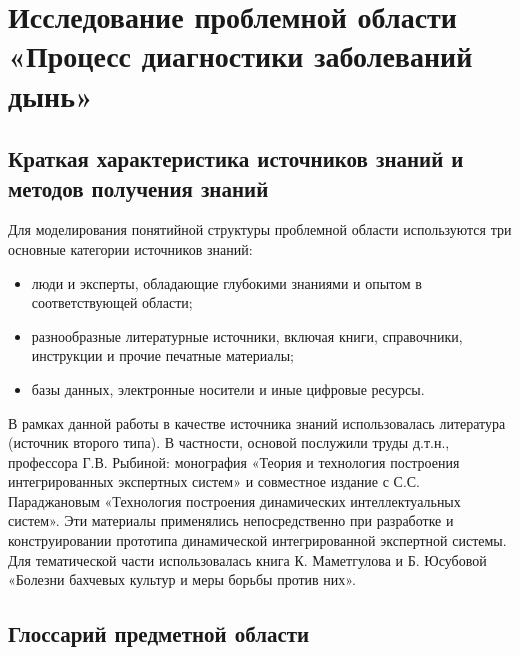 \chapter{Исследование проблемной области «Процесс диагностики заболеваний дынь»}
\label{chapter1}

\section{Краткая характеристика источников знаний и методов получения знаний}

Для моделирования понятийной структуры проблемной области используются три основные категории источников знаний:
\begin{itemize}
    \item люди и эксперты, обладающие глубокими знаниями и опытом в соответствующей области;
    \item разнообразные литературные источники, включая книги, справочники, инструкции и прочие печатные материалы;
    \item базы данных, электронные носители и иные цифровые ресурсы.
\end{itemize}

В рамках данной работы в качестве источника знаний использовалась литература (источник второго типа). В частности, основой послужили труды д.т.н., профессора Г.В. Рыбиной: монография «Теория и технология построения интегрированных экспертных систем» и совместное издание с С.С. Параджановым «Технология построения динамических интеллектуальных систем». Эти материалы применялись непосредственно при разработке и конструировании прототипа динамической интегрированной экспертной системы. Для тематической части использовалась книга К. Маметгулова и Б. Юсубовой «Болезни бахчевых культур и меры борьбы против них».

\section{Глоссарий предметной области}

